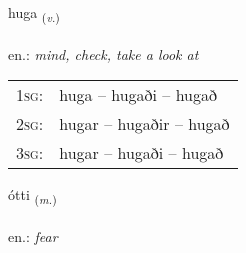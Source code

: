 \documentclass[frontgrid, backgrid]{flacards}\usepackage[]{graphicx}\usepackage[]{xcolor}
\begin{document}
\renewcommand{\flhead}{\vskip5pt \fboxsep=0pt {\small\bfseries\footnotesize Sagnorð | Verb}}
\renewcommand{\fcfoot}{\vskip5pt \fboxsep=0pt \hspace{2pt}{\small\bfseries\footnotesize 2K}}

\renewcommand{\blhead}{\vskip5pt {\small\bfseries\footnotesize Sagnorð | Verb }}
\renewcommand{\bcfoot}{\vskip5pt \hspace{2pt}{\small\bfseries\footnotesize 2K}}


{huga \small{\textsubscript{(\textit{v.})}} \\[1ex] %
\textphonetic{[hʏːɣa]} \\
en.: \emph{mind, check, take a look at} \\  [2ex]
\renewcommand*{\arraystretch}{0.8}
\begin{tabular}{p{1cm}l}
\textsc{1sg}: & huga -- hugaði -- hugað \\ 
\textsc{2sg}: & hugar -- hugaðir -- hugað \\ 
\textsc{3sg}: & hugar -- hugaði -- hugað \\ 
\end{tabular}
}

\renewcommand{\flhead}{\vskip5pt \fboxsep=0pt {\small\bfseries\footnotesize Nafnorð | Noun}}
\renewcommand{\fcfoot}{\vskip5pt \fboxsep=0pt \hspace{2pt}{\small\bfseries\footnotesize 2K}}

\renewcommand{\blhead}{\vskip5pt {\small\bfseries\footnotesize Nafnorð | Noun }}
\renewcommand{\bcfoot}{\vskip5pt \hspace{2pt}{\small\bfseries\footnotesize 2K}}


{ótti \small{\textsubscript{(\textit{m.})}} \\[1ex] %
\textphonetic{[ouhtɪ]} \\
en.: \emph{fear} \\  [2ex]
\renewcommand*{\arraystretch}{0.8}
}
\end{document}
